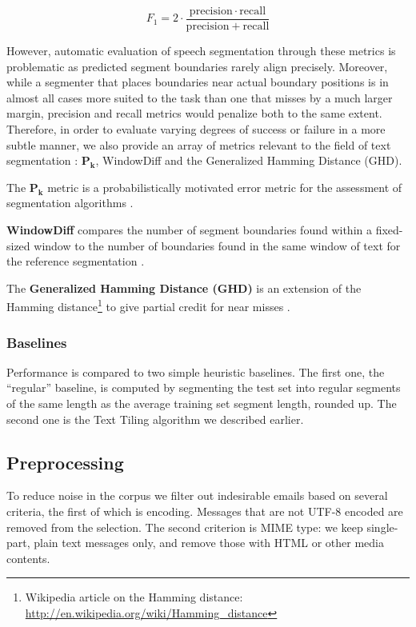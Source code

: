 \[
    F_1 = 2 \cdot \frac{\mathrm{precision} \cdot \mathrm{recall}}{\mathrm{precision} + \mathrm{recall}}
\]

However, automatic evaluation of speech segmentation through these metrics is problematic as predicted segment boundaries rarely align precisely. Moreover, while a segmenter that places boundaries near actual boundary positions is in almost all cases more suited to the task than one that misses by a much larger margin, precision and recall metrics would penalize both to the same extent. Therefore, in order to evaluate varying degrees of success or failure in a more subtle manner, we also provide an array of metrics relevant to the field of text segmentation : $\bm{P_{k}}$, WindowDiff and the Generalized Hamming Distance (GHD).

The $\bm{P_{k}}$ metric is a probabilistically motivated error metric for the assessment of segmentation algorithms \cite{beeferman1999statistical}.

\textbf{WindowDiff} compares the number of segment boundaries found within a fixed-sized window to the number of boundaries found in the same window of text for the reference segmentation \cite{pevzner2002critique}.

The \textbf{Generalized Hamming Distance (GHD)} is an extension of the Hamming distance\footnote{Wikipedia article on the Hamming distance: \url{http://en.wikipedia.org/wiki/Hamming_distance}} to give partial credit for near misses \cite{bookstein2002generalized}.

\subsubsection{Baselines}

Performance is compared to two simple heuristic baselines. The first one, the ``regular'' baseline, is computed by segmenting the test set into regular segments of the same length as the average training set segment length, rounded up. The second one is the Text Tiling algorithm we described earlier.

\subsection{Preprocessing}

To reduce noise in the corpus we filter out indesirable emails based on several criteria, the first of which is encoding. Messages that are not UTF-8 encoded are removed from the selection. The second criterion is MIME type: we keep single-part, plain text messages only, and remove those with HTML or other media contents.

